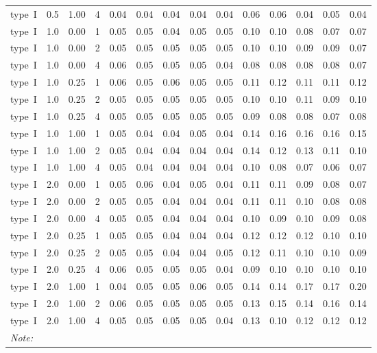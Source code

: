 \begin{table}
\begin{tabular}[t]{lrrrrrrrrrrrrr}
type~I & 0.5 & 1.00 & 4 & 0.04 & 0.04 & 0.04 & 0.04 & 0.04 & 0.06 & 0.06 & 0.04 & 0.05 & 0.04\\
type~I & 1.0 & 0.00 & 1 & 0.05 & 0.05 & 0.04 & 0.05 & 0.05 & 0.10 & 0.10 & 0.08 & 0.07 & 0.07\\
type~I & 1.0 & 0.00 & 2 & 0.05 & 0.05 & 0.05 & 0.05 & 0.05 & 0.10 & 0.10 & 0.09 & 0.09 & 0.07\\
type~I & 1.0 & 0.00 & 4 & 0.06 & 0.05 & 0.05 & 0.05 & 0.04 & 0.08 & 0.08 & 0.08 & 0.08 & 0.07\\
type~I & 1.0 & 0.25 & 1 & 0.06 & 0.05 & 0.06 & 0.05 & 0.05 & 0.11 & 0.12 & 0.11 & 0.11 & 0.12\\
type~I & 1.0 & 0.25 & 2 & 0.05 & 0.05 & 0.05 & 0.05 & 0.05 & 0.10 & 0.10 & 0.11 & 0.09 & 0.10\\
type~I & 1.0 & 0.25 & 4 & 0.05 & 0.05 & 0.05 & 0.05 & 0.05 & 0.09 & 0.08 & 0.08 & 0.07 & 0.08\\
type~I & 1.0 & 1.00 & 1 & 0.05 & 0.04 & 0.04 & 0.05 & 0.04 & 0.14 & 0.16 & 0.16 & 0.16 & 0.15\\
type~I & 1.0 & 1.00 & 2 & 0.05 & 0.04 & 0.04 & 0.04 & 0.04 & 0.14 & 0.12 & 0.13 & 0.11 & 0.10\\
type~I & 1.0 & 1.00 & 4 & 0.05 & 0.04 & 0.04 & 0.04 & 0.04 & 0.10 & 0.08 & 0.07 & 0.06 & 0.07\\
type~I & 2.0 & 0.00 & 1 & 0.05 & 0.06 & 0.04 & 0.05 & 0.04 & 0.11 & 0.11 & 0.09 & 0.08 & 0.07\\
type~I & 2.0 & 0.00 & 2 & 0.05 & 0.05 & 0.04 & 0.04 & 0.04 & 0.11 & 0.11 & 0.10 & 0.08 & 0.08\\
type~I & 2.0 & 0.00 & 4 & 0.05 & 0.05 & 0.04 & 0.04 & 0.04 & 0.10 & 0.09 & 0.10 & 0.09 & 0.08\\
type~I & 2.0 & 0.25 & 1 & 0.05 & 0.05 & 0.04 & 0.04 & 0.04 & 0.12 & 0.12 & 0.12 & 0.10 & 0.10\\
type~I & 2.0 & 0.25 & 2 & 0.05 & 0.05 & 0.04 & 0.04 & 0.05 & 0.12 & 0.11 & 0.10 & 0.10 & 0.09\\
type~I & 2.0 & 0.25 & 4 & 0.06 & 0.05 & 0.05 & 0.05 & 0.04 & 0.09 & 0.10 & 0.10 & 0.10 & 0.10\\
type~I & 2.0 & 1.00 & 1 & 0.04 & 0.05 & 0.05 & 0.06 & 0.05 & 0.14 & 0.14 & 0.17 & 0.17 & 0.20\\
type~I & 2.0 & 1.00 & 2 & 0.06 & 0.05 & 0.05 & 0.05 & 0.05 & 0.13 & 0.15 & 0.14 & 0.16 & 0.14\\
type~I & 2.0 & 1.00 & 4 & 0.05 & 0.05 & 0.05 & 0.05 & 0.04 & 0.13 & 0.10 & 0.12 & 0.12 & 0.12\\
\bottomrule
\multicolumn{14}{l}{\textit{Note: }}\\

\end{tabular}
\end{table}
